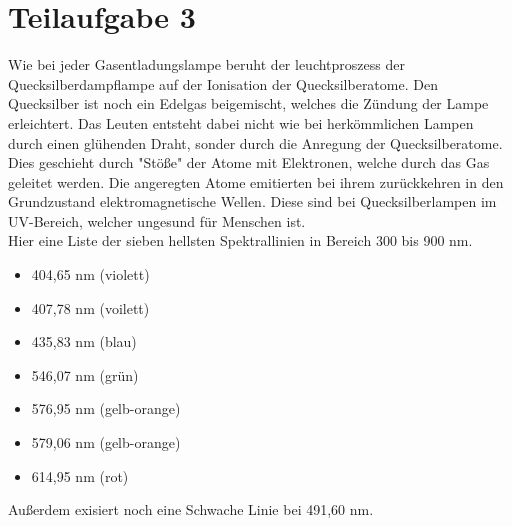 

\section{Teilaufgabe 3}

Wie bei jeder Gasentladungslampe beruht der leuchtproszess der Quecksilberdampflampe auf der Ionisation der Quecksilberatome. Den Quecksilber ist noch ein Edelgas beigemischt, welches
die Zündung der Lampe erleichtert. Das Leuten entsteht dabei nicht wie bei herkömmlichen Lampen durch einen glühenden Draht, sonder durch die Anregung der Quecksilberatome.
Dies geschieht durch "Stöße" der Atome mit Elektronen, welche durch das Gas geleitet werden. Die angeregten Atome emitierten bei ihrem zurückkehren in den Grundzustand elektromagnetische Wellen.
Diese sind bei Quecksilberlampen im UV-Bereich, welcher ungesund für Menschen ist.\\
Hier eine Liste der sieben hellsten Spektrallinien in Bereich 300 bis 900 nm.
\begin{itemize}
    \item 404,65 nm (violett)
    \item 407,78 nm (voilett)
    \item 435,83 nm (blau)
    \item 546,07 nm (grün)
    \item 576,95 nm (gelb-orange)
    \item 579,06 nm (gelb-orange)
    \item 614,95 nm (rot)
\end{itemize}
Außerdem exisiert noch eine Schwache Linie bei 491,60 nm.